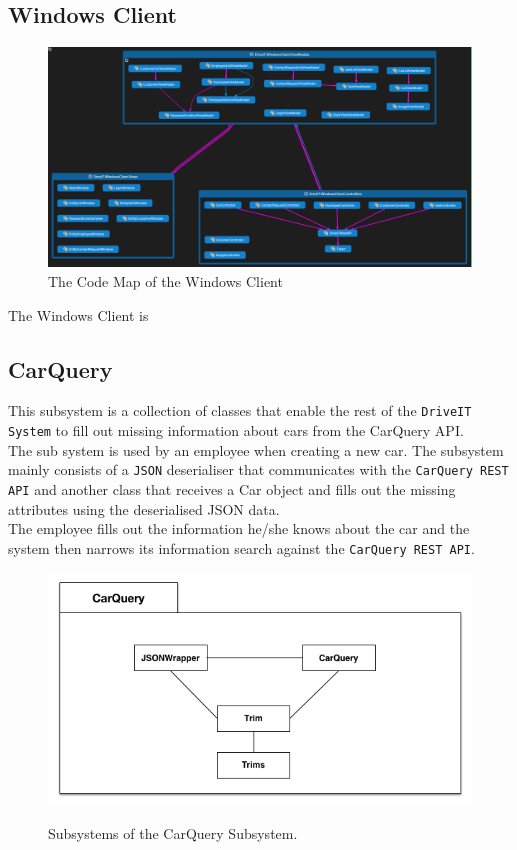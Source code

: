\subsection{Windows Client} 
\begin{figure}[H]
	\centering
	\includegraphics[scale=0.35]{Figures/WindowsClientCodeMap}
	\caption{The Code Map of the Windows Client}
	\label{fig:WindowsClientCodeMap}
\end{figure}
The Windows Client is 

\subsection{CarQuery} This subsystem is a collection of classes that enable the rest of the \texttt{DriveIT System} to fill out missing information about cars from the CarQuery API.\\
The sub system is used by an employee when creating a new car. The subsystem mainly consists of a \texttt{JSON} deserialiser that communicates with the \texttt{CarQuery REST API} and another class that receives a Car object and fills out the missing attributes using the deserialised JSON data. \\
The employee fills out the information he/she knows about the car and the system then narrows its information search against the \texttt{CarQuery REST API}.
\begin{figure}[H]
	\centering
	\includegraphics[scale=0.60]{Figures/CarQuerySubsystemDecomposition}\\
	\caption{Subsystems of the CarQuery Subsystem.}
\end{figure}